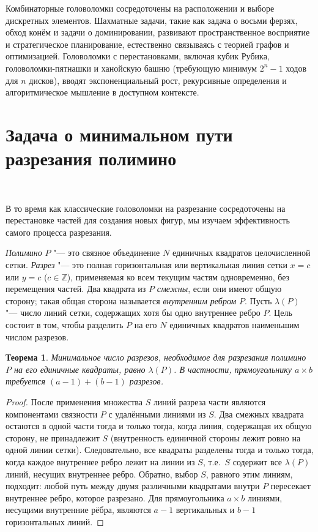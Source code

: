 \documentclass[a4paper,14pt]{extreport}
\theoremstyle{plain}
\newtheorem{theorem}{Теорема}[section]
\theoremstyle{definition}
\theoremstyle{remark}
\begin{document}
Комбинаторные головоломки сосредоточены на расположении и выборе дискретных элементов. Шахматные задачи, такие как задача о восьми ферзях, обход конём и задачи о доминировании, развивают пространственное восприятие и стратегическое планирование, естественно связываясь с теорией графов и оптимизацией. Головоломки с перестановками, включая кубик Рубика, 
головоломки-пятнашки и ханойскую башню (требующую минимум $2^n - 1$ ходов для $n$ дисков), вводят экспоненциальный рост, рекурсивные определения и алгоритмическое мышление в 
доступном контексте.
\section{Задача о минимальном пути разрезания полимино}~\label{sec4.2}

В то время как классические головоломки на разрезание сосредоточены на перестановке частей для создания новых фигур, мы изучаем эффективность самого процесса разрезания.

\emph{Полимино} $P$ "--- это связное объединение $N$ единичных квадратов целочисленной сетки. \emph{Разрез} "--- это полная горизонтальная или вертикальная линия сетки
$x=c$ или $y=c$ ($c\in\mathbb Z$), применяемая ко всем текущим частям одновременно, без перемещения частей. Два квадрата из $P$ \emph{смежны}, если они имеют общую сторону;
такая общая сторона называется \emph{внутренним ребром} $P$. Пусть $\lambda(P)$ "--- число линий сетки, содержащих хотя бы одно внутреннее ребро $P$.
Цель состоит в том, чтобы разделить $P$ на его $N$ единичных квадратов наименьшим числом разрезов.

\begin{theorem}\label{thm:min-dissection-path}
	Минимальное число разрезов, необходимое для разрезания полимино $P$ на его единичные квадраты, равно $\lambda(P)$. В частности, прямоугольнику $a\times b$ требуется $(a-1)+(b-1)$ разрезов.
\end{theorem}

\begin{proof}
	После применения множества $S$ линий разреза части являются компонентами связности $P$ с удалёнными линиями из $S$. Два смежных квадрата остаются в одной части
	тогда и только тогда, когда линия, содержащая их общую сторону, не принадлежит $S$ (внутренность единичной стороны лежит ровно на одной линии сетки).
	Следовательно, все квадраты разделены тогда и только тогда, когда каждое внутреннее ребро лежит на линии из $S$, т.е.\ $S$ содержит все $\lambda(P)$ линий, несущих внутреннее ребро.
	Обратно, выбор $S$, равного этим линиям, подходит: любой путь между двумя различными квадратами внутри $P$ пересекает внутреннее ребро, которое разрезано.
	Для прямоугольника $a\times b$ линиями, несущими внутренние рёбра, являются $a-1$ вертикальных и $b-1$ горизонтальных линий.
\end{proof}
\end{document}
